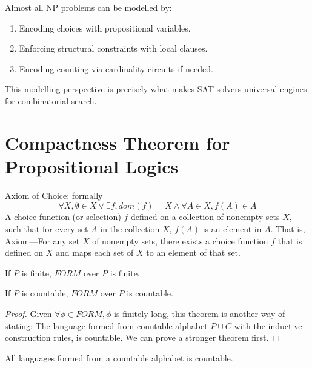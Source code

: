 \documentclass{article}
\newtheorem{theorem}{Theorem}[section]
\newtheorem{definition}[theorem]{Definition}
\let\olddefinition\definition
\let\endolddefinition\enddefinition
\renewenvironment{definition}
  {\begin{tcolorbox}[
      colback=red!10,
      colframe=red!50!black,
      boxrule=0.6pt,
      arc=2pt,
      left=6pt,right=6pt,top=4pt,bottom=4pt,
      breakable
    ]\olddefinition}
  {\endolddefinition\end{tcolorbox}}
\let\oldtheorem\theorem
\let\endoldtheorem\endtheorem
\renewenvironment{theorem}
  {\begin{tcolorbox}[
      colback=yellow!6,
      colframe=yellow!60!black,
      boxrule=0.6pt,
      arc=2pt,
      left=6pt,right=6pt,top=4pt,bottom=4pt,
      parbox=false
    ]\oldtheorem}
  {\endoldtheorem\end{tcolorbox}}
\begin{document}
Almost all NP problems can be modelled by:

\begin{enumerate}
    \item Encoding choices with propositional variables.
    \item Enforcing structural constraints with local clauses.
    \item Encoding counting via cardinality circuits if needed.
\end{enumerate}

This modelling perspective is precisely what makes SAT solvers
universal engines for combinatorial search.

\section{Compactness Theorem for Propositional Logics}
\begin{definition}
    Axiom of Choice: formally
    \[\forall X, \emptyset \in X \lor \exists f, dom(f)= X \land \forall A \in X, f(A) \in A\]
    A choice function (or selection) $f$ defined on a collection of nonempty sets $X$, such that for every set $A$ in the collection $X$,
    $f(A)$ is an element in $A$. That is, Axiom—For any set $X$ of nonempty sets, 
    there exists a choice function $f$ that is defined on $X$ and maps each set of $X$ to an element of that set. 
\end{definition}
\begin{theorem}
    If $P$ is finite, $FORM$ over $P$ is finite.
\end{theorem}
\begin{theorem}
    If $P$ is countable, $FORM$ over $P$ is countable.
\end{theorem}
\begin{proof}
    Given $\forall \phi \in FORM, \phi$ is finitely long, this theorem is another way of stating: The language formed from countable 
    alphabet $P\cup C$ with the inductive construction rules, is countable. We can prove a stronger theorem first. 
\end{proof}
\begin{theorem}
    All languages formed from a countable alphabet is countable. 
\end{theorem}
\end{document}
